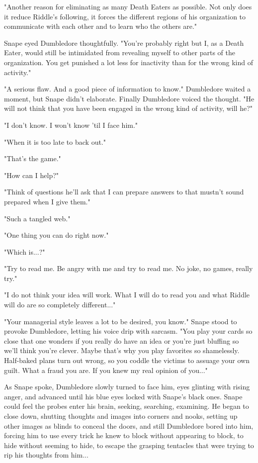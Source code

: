 "Another reason for eliminating as many Death Eaters as possible. Not only does it reduce Riddle's following, it forces the different regions of his organization to communicate with each other and to learn who the others are."

Snape eyed Dumbledore thoughtfully. "You're probably right but I, as a Death Eater, would still be intimidated from revealing myself to other parts of the organization. You get punished a lot less for inactivity than for the wrong kind of activity."

"A serious flaw. And a good piece of information to know." Dumbledore waited a moment, but Snape didn't elaborate. Finally Dumbledore voiced the thought. "He will not think that you have been engaged in the wrong kind of activity, will he?"

"I don't know. I won't know 'til I face him."

"When it is too late to back out."

"That's the game."

"How can I help?"

"Think of questions he'll ask that I can prepare answers to that mustn't sound prepared when I give them."

"Such a tangled web."

"One thing you can do right now."

"Which is...?"

"Try to read me. Be angry with me and try to read me. No joke, no games, really try."

"I do not think your idea will work. What I will do to read you and what Riddle will do are so completely different..."

"Your managerial style leaves a lot to be desired, you know." Snape stood to provoke Dumbledore, letting his voice drip with sarcasm. "You play your cards so close that one wonders if you really do have an idea or you're just bluffing so we'll think you're clever. Maybe that's why you play favorites so shamelessly. Half-baked plans turn out wrong, so you coddle the victims to assuage your own guilt. What a fraud you are. If you knew my real opinion of you..."

As Snape spoke, Dumbledore slowly turned to face him, eyes glinting with rising anger, and advanced until his blue eyes locked with Snape's black ones. Snape could feel the probes enter his brain, seeking, searching, examining. He began to close down, shutting thoughts and images into corners and nooks, setting up other images as blinds to conceal the doors, and still Dumbledore bored into him, forcing him to use every trick he knew to block without appearing to block, to hide without seeming to hide, to escape the grasping tentacles that were trying to rip his thoughts from him...

